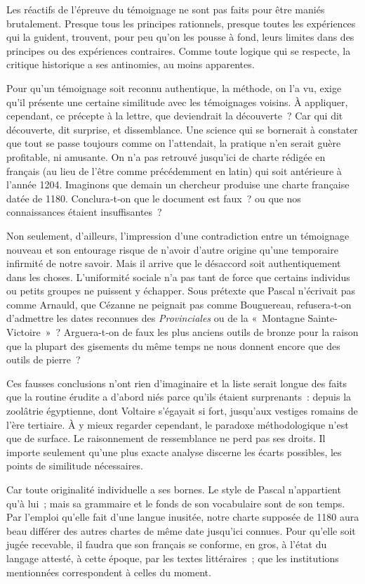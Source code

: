\documentclass[french,twoside]{book} %
\begin{document}
\noindent Les réactifs de l’épreuve du témoignage ne sont pas faits pour être maniés brutalement. Presque tous les principes rationnels, presque toutes  
\label{p58} les expériences qui la guident, trouvent, pour peu qu’on les pousse à fond, leurs limites dans des principes ou des expériences contraires. Comme toute logique qui se respecte, la critique historique a ses antinomies, au moins apparentes.\par
Pour qu’un témoignage soit reconnu authentique, la méthode, on l’a vu, exige qu’il présente une certaine similitude avec les témoignages voisins. À appliquer, cependant, ce précepte à la lettre, que deviendrait la découverte ? Car qui dit découverte, dit surprise, et dissemblance. Une science qui se bornerait à constater que tout se passe toujours comme on l’attendait, la pratique n’en serait guère profitable, ni amusante. On n’a pas retrouvé jusqu’ici de charte rédigée en français (au lieu de l’être comme précédemment en latin) qui soit antérieure à l’année 1204. Ima­ginons que demain un chercheur produise une charte française datée de 1180. Conclura‑t‑on que le document est faux ? ou que nos connaissances étaient insuffisantes ?\par
Non seulement, d’ailleurs, l’impression d’une contradiction entre un témoignage nouveau et son entourage risque de n’avoir d’autre origine qu’une temporaire infirmité de notre savoir. Mais il arrive que le désaccord soit authentiquement dans les choses. L’uniformité sociale n’a pas tant de force que certains individus ou petits groupes ne puissent y échapper. Sous prétexte que Pascal n’écrivait pas comme Arnauld, que Cézanne ne peignait pas comme Bouguereau, refusera‑t‑on d’admettre les dates reconnues des \emph{Provinciales} ou de la « Montagne Sainte-Victoire » ? Arguera­-t‑on de faux les plus anciens outils de bronze pour la raison que la plupart des gisements du même temps ne nous donnent encore que des outils de pierre ?\par
Ces fausses conclusions n’ont rien d’imaginaire et la liste serait longue des faits que la routine érudite a d’abord niés parce qu’ils étaient sur­prenants : depuis la zoolâtrie égyptienne, dont Voltaire s’égayait si fort, jusqu’aux vestiges romains de l’ère tertiaire. À y mieux regarder cepen­dant, le paradoxe méthodologique n’est que de surface. Le raisonnement de ressemblance ne perd pas ses droits. Il importe seulement qu’une plus exacte analyse discerne les écarts possibles, les points de similitude néces­saires.\par
Car toute originalité individuelle a ses bornes. Le style de Pascal n’ap­partient qu’à lui ; mais sa grammaire et le fonds de son vocabulaire sont de son temps. Par l’emploi qu’elle fait d’une langue inusitée, notre charte supposée de 1180 aura beau différer des autres chartes de même date jusqu’ici connues. Pour qu’elle soit jugée recevable, il faudra que son français se conforme, en gros, à l’état du langage attesté, à cette époque, par les textes littéraires ; que les institutions mentionnées cor­respondent à celles du moment.\par
\end{document}
